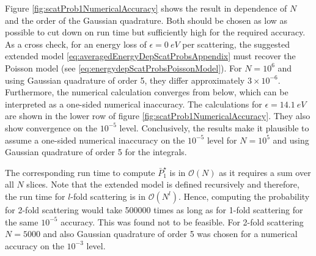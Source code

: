 Figure \ref{fig:scatProb1NumericalAccuracy} shows the result in dependence of $N$ and the order of the Gaussian quadrature. Both should be chosen as low as possible to cut down on run time but sufficiently high for the required accuracy. As a cross check, for an energy loss of $\epsilon=\SI{0}{eV}$ per scattering, the suggested extended model \eqref{eq:averagedEnergyDepScatProbsAppendix} must recover the Poisson model (see \eqref{eq:energydepScatProbsPoissonModel}). For $N=10^6$ and using Gaussian quadrature of order 5, they differ approximately $3\times10^{-6}$. Furthermore, the numerical calculation converges from below, which can be interpreted as a one-sided numerical inaccuracy. The calculations for $\epsilon=\SI{14.1}{eV}$ are shown in the lower row of figure \ref{fig:scatProb1NumericalAccuracy}. They also show convergence on the $10^{-5}$ level. Conclusively, the results make it plausible to assume a one-sided numerical inaccuracy on the $10^{-5}$ level for $N=10^5$ and using Gaussian quadrature of order 5 for the integrals.

The corresponding run time to compute $\bar{P}^{\star}_1$ is in $\mathcal{O}(N)$ as it requires a sum over all $N$ slices. Note that the extended model is defined recursively and therefore, the run time for $l$-fold scattering is in $\mathcal{O}(N^l)$. Hence, computing the probability for 2-fold scattering would take 500000 times as long as for 1-fold scattering for the same $10^{-5}$ accuracy. This was found not to be feasible. For 2-fold scattering $N=5000$ and also Gaussian quadrature of order 5 was chosen for a numerical accuracy on the $10^{-3}$ level.